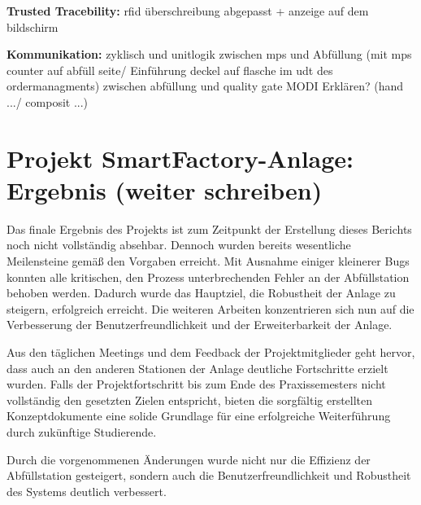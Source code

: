 \textbf{Trusted Tracebility:} 
rfid überschreibung abgepasst + anzeige auf dem bildschirm 

\textbf{Kommunikation:} 
zyklisch und unitlogik zwischen mps und Abfüllung (mit mps counter auf abfüll seite/ Einführung deckel auf flasche im udt des ordermanagments)
zwischen abfüllung und quality gate 
MODI Erklären? (hand .../ composit ...)


\section{Projekt SmartFactory-Anlage: Ergebnis (weiter schreiben)}

Das finale Ergebnis des Projekts ist zum Zeitpunkt der Erstellung dieses Berichts noch nicht vollständig absehbar. Dennoch wurden bereits 
wesentliche Meilensteine gemäß den Vorgaben erreicht. Mit Ausnahme einiger kleinerer Bugs konnten alle kritischen, den Prozess unterbrechenden 
Fehler an der Abfüllstation behoben werden. Dadurch wurde das Hauptziel, die Robustheit der Anlage zu steigern, erfolgreich erreicht. Die 
weiteren Arbeiten konzentrieren sich nun auf die Verbesserung der Benutzerfreundlichkeit und der Erweiterbarkeit der Anlage.

Aus den täglichen Meetings und dem Feedback der Projektmitglieder geht hervor, dass auch an den anderen Stationen der Anlage deutliche 
Fortschritte erzielt wurden. Falls der Projektfortschritt bis zum Ende des Praxissemesters nicht vollständig den gesetzten Zielen entspricht, 
bieten die sorgfältig erstellten Konzeptdokumente eine solide Grundlage für eine erfolgreiche Weiterführung durch zukünftige Studierende.

Durch die vorgenommenen Änderungen wurde nicht nur die Effizienz der Abfüllstation gesteigert, sondern auch die Benutzerfreundlichkeit und 
Robustheit des Systems deutlich verbessert.


